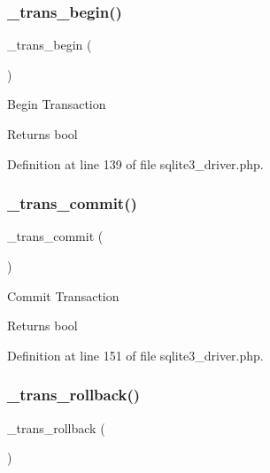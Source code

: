 \subsubsection{\texorpdfstring{\_trans\_begin()}{\_trans\_begin()}}
{\footnotesize\ttfamily \+\_\+trans\+\_\+begin (\begin{DoxyParamCaption}{ }\end{DoxyParamCaption})\hspace{0.3cm}{\ttfamily [protected]}}

Begin Transaction

\begin{DoxyReturn}{Returns}
bool 
\end{DoxyReturn}


Definition at line 139 of file sqlite3\+\_\+driver.\+php.

\mbox{\label{class_c_i___d_b__sqlite3__driver_a6fe7f373e0b11cfae23a5f41c0b35dda}} 
\subsubsection{\texorpdfstring{\_trans\_commit()}{\_trans\_commit()}}
{\footnotesize\ttfamily \+\_\+trans\+\_\+commit (\begin{DoxyParamCaption}{ }\end{DoxyParamCaption})\hspace{0.3cm}{\ttfamily [protected]}}

Commit Transaction

\begin{DoxyReturn}{Returns}
bool 
\end{DoxyReturn}


Definition at line 151 of file sqlite3\+\_\+driver.\+php.

\mbox{\label{class_c_i___d_b__sqlite3__driver_ad49a116b0776c26b53114c9093fd102a}} 
\subsubsection{\texorpdfstring{\_trans\_rollback()}{\_trans\_rollback()}}
{\footnotesize\ttfamily \+\_\+trans\+\_\+rollback (\begin{DoxyParamCaption}{ }\end{DoxyParamCaption})\hspace{0.3cm}{\ttfamily [protected]}}

